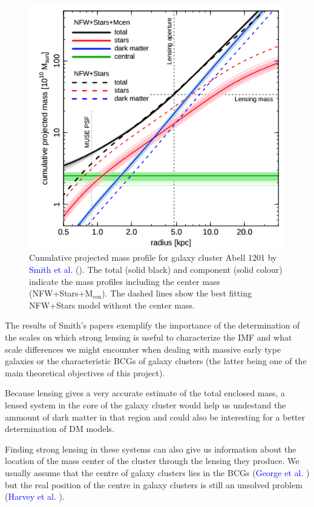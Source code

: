 \begin{figure}[H]
\centering
\includegraphics[width=12cm]{images/smith.png}
\caption[Projected mass of cluster Abell 1201]{Cumulative projected mass profile for galaxy cluster Abell 1201 by \textcolor{blue}{Smith et al.} (\citeyear{Reference34}). The total (solid black) and component (solid colour) indicate the mass profiles including the center mass (NFW+Stars+M$_{\text{cen}}$). The dashed lines show the best fitting NFW+Stars model without the center mass.}
\end{figure}

The results of Smith's papers exemplify the importance of the determination of the scales on which strong lensing is useful to characterize the IMF and what scale differences we might encounter when dealing with massive early type galaxies or the characteristic BCGs of galaxy clusters (the latter being one of the main theoretical objectives of this project). 

Because lensing gives a very accurate estimate of the total enclosed mass, a lensed system in the core of the galaxy cluster would help us undestand the ammount of dark matter in that region and could also be interesting for a better determination of DM models.

Finding strong lensing in these systems can also give us information about the location of the mass center of the cluster through the lensing they produce. We usually assume that the centre of galaxy clusters lies in the BCGs (\textcolor{blue}{George et al.} \citeyear{Reference18}) but the real position of the centre in galaxy clusters is still an unsolved problem (\textcolor{blue}{Harvey et al.} \citeyear{Reference13}). 

